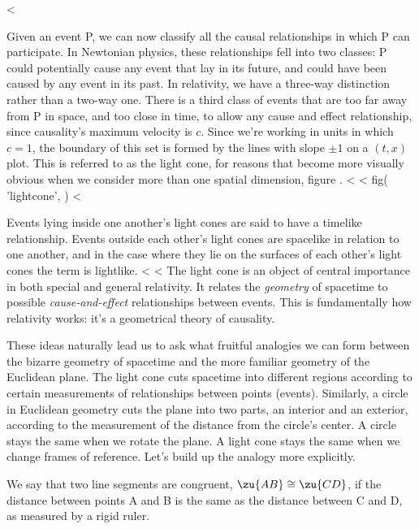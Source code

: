 <%

Given an event P, we can now classify all the causal relationships in which P can participate.
In Newtonian physics, these relationships fell into two classes: P could potentially cause any event
that lay in its future, and could have been caused by any event in its past.
In relativity, we have a three-way distinction rather than a two-way one. There is a third class
of events that are too far away from P in space, and too close in time, to allow any cause and effect
relationship, since causality's maximum velocity is $c$. Since we're working in units in which $c=1$,
the boundary of this set is formed by the lines with slope $\pm1$ on a $(t,x)$ plot. This is referred
to as the light cone, for reasons that become more visually obvious when we consider
more than one spatial dimension, figure .
<%
<%
  fig(
    'lightcone',
  )
<%

Events lying inside one another's light cones are said to have a timelike relationship. Events outside each
other's light cones are spacelike in relation to one another, and in the case where they lie on the surfaces
of each other's light cones the term is lightlike.
<%
<%
The light cone is an object of central importance in both special and general relativity. It relates
the \emph{geometry} of spacetime to possible \emph{cause-and-effect} relationships between events. This
is fundamentally how relativity works: it's a geometrical theory of causality. 

These ideas naturally lead
us to ask what fruitful analogies we can form between the bizarre geometry of spacetime and the
more familiar geometry of the Euclidean plane. The light cone cuts spacetime into different regions according
to certain measurements of relationships between points (events). Similarly, a circle in Euclidean geometry
cuts the plane into two parts, an interior and an exterior, according to the measurement of the distance from
the circle's center. A circle stays the same when we rotate the plane. A light cone stays the same when we
change frames of reference. Let's build up the analogy more explicitly.

\begin{lessimportant}
We say that two line segments are congruent, $\zu{AB}\cong \zu{CD}$, if the distance between points A and B is the same
as the distance between C and D, as measured by a rigid ruler.
\end{lessimportant}

